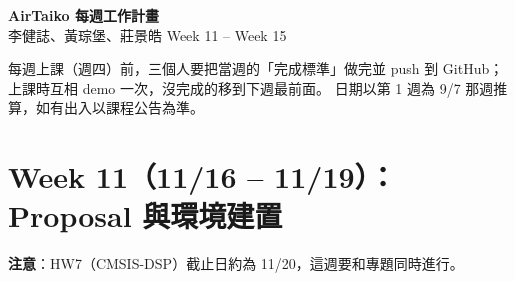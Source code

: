 \documentclass[11pt]{article}
\begin{document}
\begin{center}
{\LARGE\bfseries AirTaiko 每週工作計畫}\\[0.4em]
{\small 李健誌、黃琮堡、莊景皓 Week 11 -- Week 15}
\end{center}

每週上課（週四）前，三個人要把當週的「完成標準」做完並 push 到 GitHub；上課時互相 demo 一次，沒完成的移到下週最前面。
日期以第 1 週為 9/7 那週推算，如有出入以課程公告為準。


\section*{Week 11（11/16 -- 11/19）：Proposal 與環境建置}

\textbf{注意}：HW7（CMSIS-DSP）截止日約為 11/20，這週要和專題同時進行。
\end{document}
